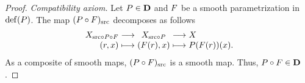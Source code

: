 \begin{proof}
  {\em Compatibility axiom.}
  Let $P \in {\mathbf D}$ and $F$ be a smooth parametrization in $\mathrm{def}(P)$.
  The map $(P \circ F)_{\operatorname{src}}$ decomposes as follows
  $$%
  \begin{array}{r@{\hspace{3pt}}c@{\hspace{3pt}}c@{\hspace{3pt}}c@{\hspace{3pt}}l@{\hspace{3pt}}}
    \X_{\source \circ \P \circ \F} & \longrightarrow & \X_{\source \circ \P} & \longrightarrow & \X  \\
    (r,x) & \longmapsto & (\F(r),x) & \longmapsto & \P(\F(r))(x).
  \end{array}
  $$%
%
  As a composite of smooth maps,
  $(P \circ F)_{\operatorname{src}}$ is a smooth map.
  Thus,
  $P \circ F \in {\mathbf D}$.
  

\end{proof}
